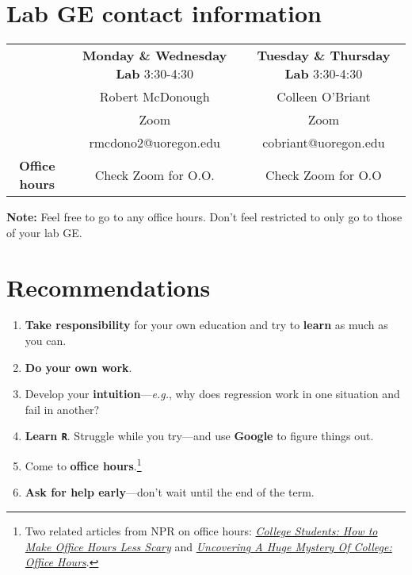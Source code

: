 \documentclass[10pt]{article}
\newcommand{\ra}[1]{\renewcommand{\arraystretch}{#1}}
\begin{document}
\newpage

\section*{Lab GE contact information}
\begin{table}[!h]
  \centering
  \ra{1.1}
  \begin{tabular}{c c c}
    & \textbf{Monday \& Wednesday Lab} 3:30-4:30 & \textbf{Tuesday \& Thursday Lab} 3:30-4:30\\
    & Robert McDonough  & Colleen O'Briant \\
    & Zoom & Zoom\\
    & rmcdono2@uoregon.edu & cobriant@uoregon.edu\\
    \textbf{Office hours} & Check Zoom for O.O. &  Check Zoom for O.O \\
  \end{tabular}
\end{table}

\noindent \textbf{Note:} Feel free to go to any office hours. Don't feel restricted to only go to those of your lab GE.

\section*{Recommendations}

\begin{enumerate}
  \item \textbf{Take responsibility} for your own education and try to \textbf{learn} as much as you can.
  \item \textbf{Do your own work}.
  \item Develop your \textbf{intuition}---\textit{e.g.}, why does regression work in one situation and fail in another?
  \item \textbf{Learn \texttt{R}}. Struggle while you try---and use \textbf{Google} to figure things out.
  \item Come to \textbf{office hours}.\footnote{Two related articles from NPR on office hours: \href{https://www.npr.org/2019/10/05/678815966/college-students-how-to-make-office-hours-less-scary}{\textit{College Students: How to Make Office Hours Less Scary}} and \href{https://www.npr.org/2019/10/02/766568824/uncovering-a-huge-mystery-of-college-office-hours}{\textit{Uncovering A Huge Mystery Of College: Office Hours}}.}
  \item \textbf{Ask for help early}---don't wait until the end of the term.
\end{enumerate}
\end{document}
